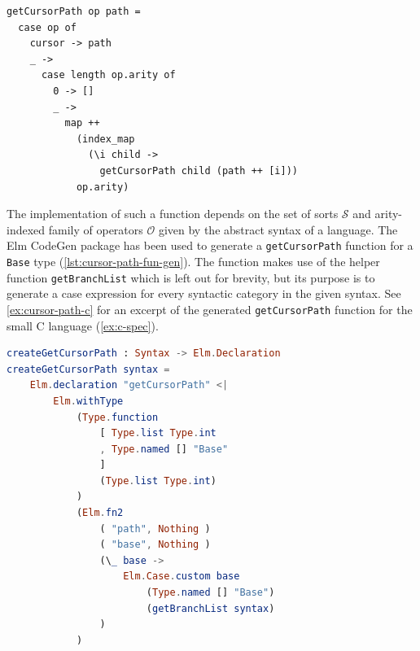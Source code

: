 \begin{lstlisting}[caption={Pseudocode for generating cursor path},label={lst:cursor-path-pseudocode},
  style=inline]
getCursorPath op path =
  case op of
    cursor -> path
    _ -> 
      case length op.arity of
        0 -> []
        _ -> 
          map ++ 
            (index_map 
              (\i child -> 
                getCursorPath child (path ++ [i])) 
            op.arity)

\end{lstlisting}

The implementation of such a function depends on the set of sorts $\mathcal{S}$
and arity-indexed family of operators $\mathcal{O}$ given by the abstract syntax
of a language. The Elm CodeGen package\cite{elm-codegen-package} has been used to
generate a \texttt{getCursorPath} function for a \texttt{Base} type (\cref{lst:cursor-path-fun-gen}).
The function makes use of the helper function
\texttt{getBranchList} which is left out for brevity, but its purpose is
to generate a case expression for every syntactic category in the given syntax.
See \cref{ex:cursor-path-c} for an excerpt of the generated \texttt{getCursorPath}
function for the small C language (\cref{ex:c-spec}).

\begin{lstlisting}[language=elm,style=inline,caption={getCursorPath function generator},label={lst:cursor-path-fun-gen}]
createGetCursorPath : Syntax -> Elm.Declaration
createGetCursorPath syntax =
    Elm.declaration "getCursorPath" <|
        Elm.withType
            (Type.function
                [ Type.list Type.int
                , Type.named [] "Base"
                ]
                (Type.list Type.int)
            )
            (Elm.fn2
                ( "path", Nothing )
                ( "base", Nothing )
                (\_ base ->
                    Elm.Case.custom base
                        (Type.named [] "Base")
                        (getBranchList syntax)
                )
            )    
\end{lstlisting}

